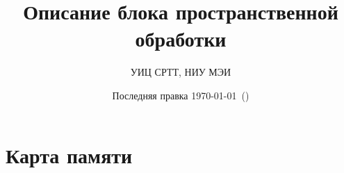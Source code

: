 


\title{Описание блока пространственной обработки}
\author{УИЦ СРТТ, НИУ МЭИ}
\date{Последняя правка \today~(\currenttime)}





\maketitle

\tableofcontents

\clearpage
\part{Карта памяти}


\newpage






